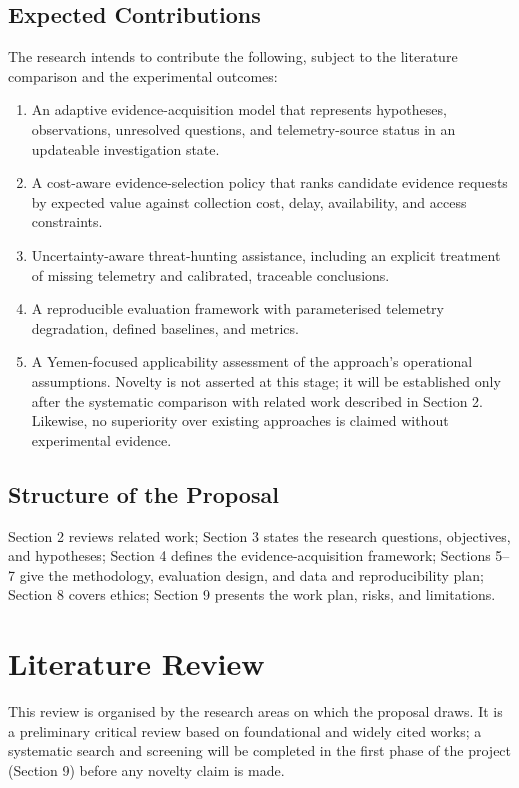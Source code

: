 \documentclass[a4paper,11pt,oneside]{article}
\begin{document}
\subsection{Expected Contributions}
The research intends to contribute the following, subject to the literature comparison and the experimental outcomes:
\begin{enumerate}[leftmargin=*, itemsep=2pt, topsep=3pt]
\item An adaptive evidence-acquisition model that represents hypotheses, observations, unresolved questions, and telemetry-source status in an updateable investigation state.
\item A cost-aware evidence-selection policy that ranks candidate evidence requests
by expected value against collection cost, delay, availability, and access constraints.
\item Uncertainty-aware threat-hunting assistance, including an explicit treatment
of missing telemetry and calibrated, traceable conclusions.
\item A reproducible evaluation framework with parameterised telemetry degradation,
defined baselines, and metrics.
\item A Yemen-focused applicability assessment of the approach’s operational assumptions. Novelty is not asserted at this stage; it will be established only after the systematic comparison with related work described in Section 2. Likewise, no superiority over existing approaches is claimed without experimental evidence.
\end{enumerate}
\subsection{Structure of the Proposal}
Section 2 reviews related work; Section 3 states the research questions, objectives, and hypotheses; Section 4 defines the evidence-acquisition framework; Sections 5–7 give the methodology, evaluation design, and data and reproducibility plan; Section 8 covers ethics; Section 9 presents the work plan, risks, and limitations.
\section{Literature Review}
This review is organised by the research areas on which the proposal draws. It is a preliminary critical review based on foundational and widely cited works; a systematic search and screening will be completed in the first phase of the project (Section 9) before any novelty claim is made.
\end{document}
